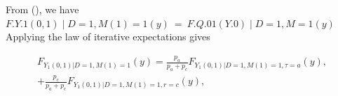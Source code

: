 \documentclass{article}
\begin{document}
From (), we have$F . { Y . { 1 } ( 0, 1 ) \mid D = 1, M ( 1 ) = 1 } ( y ) ~ = ~ F . { Q . { 0 1 } ( Y . { 0 } ) \mid D = 1, M = 1 } ( y )$ Applying the law of
iterative expectations gives


\begin{equation}
\begin{array} { r } { F _ { Y _ { 1 } ( 0, 1 ) | D = 1, M ( 1 ) = 1 } ( y ) = \frac { p _ { a } } { p _ { a } + p _ { c } } F _ { Y _ { 1 } ( 0, 1 ) | D = 1, M ( 1 ) = 1, \tau = a } ( y ), } \\ { + \frac { p _ { c } } { p _ { a } + p _ { c } } F _ { Y _ { 1 } ( 0, 1 ) | D = 1, M ( 1 ) = 1, r = c } ( y ), } \\ {}\end{array}
\end{equation}
\end{document}
